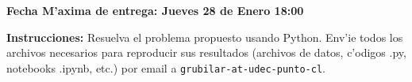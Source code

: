 \documentclass[11pt]{exam}
\begin{document}
\firstpageheadrule
\runningheadrule
{}
\cfoot{ }
\begin{flushleft}
\vspace{0.2in}
\vspace{0.25cm}
\end{flushleft}

\begin{center}
\textbf{Fecha M'axima de entrega: Jueves 28 de Enero 18:00}
\end{center}
\textbf{Instrucciones:} Resuelva el problema propuesto usando Python. Env'ie todos los archivos necesarios para reproducir sus resultados (archivos de datos, c'odigos .py, notebooks .ipynb, etc.) por email a \texttt{grubilar-at-udec-punto-cl}.

\bigskip
\end{document}
